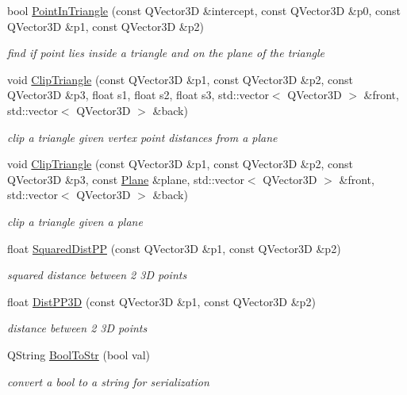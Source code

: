 \begin{DoxyCompactItemize}
bool \hyperlink{namespaceShipCAD_ae1773f0e415446342401a67430a8b643}{Point\-In\-Triangle} (const Q\-Vector3\-D \&intercept, const Q\-Vector3\-D \&p0, const Q\-Vector3\-D \&p1, const Q\-Vector3\-D \&p2)
\begin{DoxyCompactList}\small\item\em find if point lies inside a triangle and on the plane of the triangle \end{DoxyCompactList}\item 
void \hyperlink{namespaceShipCAD_a36b9b33181823761bc327d66c36c8d8f}{Clip\-Triangle} (const Q\-Vector3\-D \&p1, const Q\-Vector3\-D \&p2, const Q\-Vector3\-D \&p3, float s1, float s2, float s3, std\-::vector$<$ Q\-Vector3\-D $>$ \&front, std\-::vector$<$ Q\-Vector3\-D $>$ \&back)
\begin{DoxyCompactList}\small\item\em clip a triangle given vertex point distances from a plane \end{DoxyCompactList}\item 
void \hyperlink{namespaceShipCAD_a41e6294f71b66bca070c744accbb3ef2}{Clip\-Triangle} (const Q\-Vector3\-D \&p1, const Q\-Vector3\-D \&p2, const Q\-Vector3\-D \&p3, const \hyperlink{classShipCAD_1_1Plane}{Plane} \&plane, std\-::vector$<$ Q\-Vector3\-D $>$ \&front, std\-::vector$<$ Q\-Vector3\-D $>$ \&back)
\begin{DoxyCompactList}\small\item\em clip a triangle given a plane \end{DoxyCompactList}\item 
float \hyperlink{namespaceShipCAD_a6f9f5ac15e7e2821bba27ba06827a4e1}{Squared\-Dist\-P\-P} (const Q\-Vector3\-D \&p1, const Q\-Vector3\-D \&p2)
\begin{DoxyCompactList}\small\item\em squared distance between 2 3\-D points \end{DoxyCompactList}\item 
float \hyperlink{namespaceShipCAD_a438e97b711c6878eba3bf7182e68a3c7}{Dist\-P\-P3\-D} (const Q\-Vector3\-D \&p1, const Q\-Vector3\-D \&p2)
\begin{DoxyCompactList}\small\item\em distance between 2 3\-D points \end{DoxyCompactList}\item 
Q\-String \hyperlink{namespaceShipCAD_a45ba7de6922e89cbddf2a4c9c810a2e4}{Bool\-To\-Str} (bool val)
\begin{DoxyCompactList}\small\item\em convert a bool to a string for serialization \end{DoxyCompactList}\item 

\end{DoxyCompactItemize}
